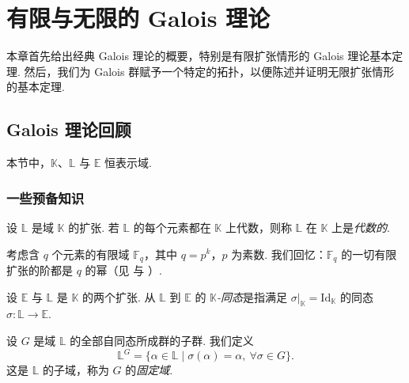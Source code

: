 
\chapter{有限与无限的 Galois 理论}
\label{ch:2}

\renewcommand{\thesubsubsection}{\thesection.\arabic{subsection}.\arabic{subsubsection}}
\renewcommand{\labelenumi}{(\arabic{enumi})}

本章首先给出经典 Galois 理论的概要，特别是有限扩张情形的 Galois 理论基本定理. 然后，我们为 Galois 群赋予一个特定的拓扑，以便陈述并证明无限扩张情形的基本定理.

\section{Galois 理论回顾}

本节中，$\mathbb{K}$、$\mathbb{L}$ 与 $\mathbb{E}$ 恒表示域.

\subsection{一些预备知识}

\begin{definition}\label{c2-def-1-1}
设 $\mathbb{L}$ 是域 $\mathbb{K}$ 的扩张. 若 $\mathbb{L}$ 的每个元素都在 $\mathbb{K}$ 上代数，则称 $\mathbb{L}$ 在 $\mathbb{K}$ 上是\emph{代数的}.
\end{definition}

\begin{example}\label{c2-ex-1-2}
考虑含 $q$ 个元素的有限域 $\mathbb{F}_q$，其中 $q=p^{k}$，$p$ 为素数. 我们回忆：$\mathbb{F}_q$ 的一切有限扩张的阶都是 $q$ 的幂（见 \cite[Thm~5.1]{lang02a} 与 \cite[Corollary~5.2]{lang02a}）.
\end{example}

\begin{definition}\label{c2-def-1-3}
设 $\mathbb{E}$ 与 $\mathbb{L}$ 是 $\mathbb{K}$ 的两个扩张. 从 $\mathbb{L}$ 到 $\mathbb{E}$ 的 \emph{$\mathbb{K}$-同态}是指满足 $\sigma|_{\mathbb{K}}=\mathrm{Id}_{\mathbb{K}}$ 的同态 $\sigma:\mathbb{L}\to\mathbb{E}$.
\end{definition}

\begin{definition}\label{c2-def-1-4}
设 $G$ 是域 $\mathbb{L}$ 的全部自同态所成群的子群. 我们定义
\[
\mathbb{L}^{G}=\{\alpha\in\mathbb{L}\mid \sigma(\alpha)=\alpha,\ \forall\sigma\in G\}.
\]
这是 $\mathbb{L}$ 的子域，称为 $G$ 的\emph{固定域}.
\end{definition}

